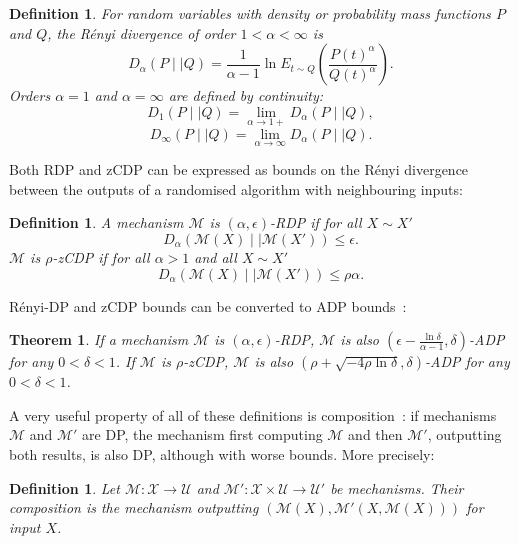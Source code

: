 \documentclass[english,twoside,openright]{HYgraduMLDS}
\newtheorem{theorem}[lemma]{Theorem}
\newtheorem{definition}[lemma]{Definition}
\newcommand{\dmid}{\mid\mid}
\newcommand{\calm}{{\mathcal{M}}}
\newcommand{\calx}{{\mathcal{X}}}
\newcommand{\calu}{{\mathcal{U}}}
\begin{document}
\begin{definition}
    For random variables with density or probability mass functions 
    \(P\) and \(Q\), the Rényi divergence of order
    \(1 < \alpha < \infty\) is
    \[
        D_\alpha(P\dmid Q) = \frac{1}{\alpha - 1}\ln E_{t\sim Q}
        \left(\frac{P(t)^\alpha}{Q(t)^\alpha}\right).
    \]
    Orders \(\alpha = 1\) and \(\alpha = \infty\) are defined 
    by continuity:
    \[
        D_1(P\dmid Q) = \lim_{\alpha \to 1+} D_\alpha(P\dmid Q),
    \]
    \[
        D_\infty(P \dmid Q) = \lim_{\alpha\to \infty}D_\alpha(P\dmid Q).
    \]
\end{definition}

Both RDP and zCDP can be expressed as bounds on the
Rényi divergence between the outputs of a randomised algorithm with
neighbouring inputs:

\begin{definition}
    A mechanism \(\calm\) is \((\alpha, \epsilon)\)-RDP
    if for all \(X \sim X'\)
    \[
        D_\alpha(\calm(X)\dmid \calm(X')) \leq \epsilon.
    \]
    \(\calm\) is \(\rho\)-zCDP if for all \(\alpha > 1\)
    and all \(X \sim X'\)
    \[
        D_\alpha(\calm(X)\dmid \calm(X')) \leq \rho \alpha.
    \]

\end{definition}

Rényi-DP and zCDP bounds can be converted to ADP bounds~\cite{Mironov17, BuS16}:
\begin{theorem}\label{other_dp_to_adp}
    If a mechanism \(\calm\) is \((\alpha, \epsilon)\)-RDP, \(\calm\) is also
    \((\epsilon - \frac{\ln \delta}{\alpha - 1}, \delta)\)-ADP for any 
    \(0 < \delta < 1\). If \(\calm\) is \(\rho\)-zCDP, \(\calm\) is also 
    \((\rho + \sqrt{-4\rho\ln \delta}, \delta)\)-ADP for any \(0 < \delta < 1\).
\end{theorem}

A very useful property of all of these definitions is composition~\cite{DwR14}: 
if mechanisms \(\calm\) and \(\calm'\) are DP, the mechanism first computing
\(\calm\) and then \(\calm'\), outputting both results, 
is also DP, although with worse bounds.
More precisely:

\begin{definition}\label{composition_definition}
    Let \(\calm\colon \calx \to \calu\) and 
    \(\calm'\colon \calx\times \calu \to \calu'\) be mechanisms.
    Their composition is the mechanism outputting
    \((\calm(X), \calm'(X, \calm(X)))\) for input \(X\).
\end{definition}
\end{document}
